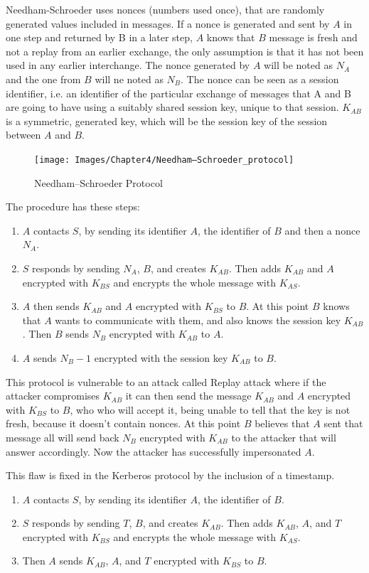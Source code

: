 Needham-Schroeder uses nonces (numbers used once), that are randomly generated values included in messages. If a nonce is generated and sent by $A$ in one step and returned by B in a later step, $A$ knows that $B$ message is fresh and not a replay from an earlier exchange, the only assumption is that it has not been used in any earlier interchange. The nonce generated by $A$ will be noted as $N_{A}$ and the one from $B$ will ne noted as $N_{B}$. The nonce can be seen as a session identifier, i.e. an identifier of the particular exchange of messages that A and B are going to have using a suitably shared session key, unique to that session. $K_{AB}$ is a symmetric, generated key, which will be the session key of the session between $A$ and $B$.

\begin{figure}
	\centering
	\texttt{[image: Images/Chapter4/Needham–Schroeder\_protocol]}
	\caption{Needham–Schroeder Protocol}
	\label{fig:needhamschroederprotocol}
\end{figure}

The procedure has these steps:
\begin{enumerate}
	\item $A$ contacts $S$, by sending its identifier $A$, the identifier of $B$ and then a nonce $N_{A}$.
	\item $S$ responds by sending $N_{A}$, $B$, and creates $K_{AB}$. Then adds $K_{AB}$ and $A$ encrypted with $K_{BS}$ and encrypts the whole message with $K_{AS}$.
	\item $A$ then sends $K_{AB}$ and $A$ encrypted with $K_{BS}$ to $B$. At this point $B$ knows that $A$ wants to communicate with them, and also knows the session key $K_{AB}$. Then $B$ sends $N_{B}$ encrypted with $K_{AB}$ to $A$.
	\item $A$ sends $N_{B} - 1$ encrypted with the session key $K_{AB}$ to $B$.
\end{enumerate}

This protocol is vulnerable to an attack called Replay attack where if the attacker compromises $K_{AB}$ it can then send the message $K_{AB}$ and $A$ encrypted with $K_{BS}$ to $B$, who who will accept it, being unable to tell that the key is not fresh, because it doesn't contain nonces. At this point $B$ believes that $A$ sent that message all will send back $N_{B}$ encrypted with $K_{AB}$ to the attacker that will answer accordingly. Now the attacker has successfully impersonated $A$.

This flaw is fixed in the Kerberos protocol by the inclusion of a timestamp.
\begin{enumerate}
	\item $A$ contacts $S$, by sending its identifier $A$, the identifier of $B$.
	\item $S$ responds by sending $T$, $B$, and creates $K_{AB}$. Then adds $K_{AB}$, $A$, and $T$ encrypted with $K_{BS}$ and encrypts the whole message with $K_{AS}$.
	\item Then $A$ sends $K_{AB}$, $A$, and $T$ encrypted with $K_{BS}$ to $B$.
\end{enumerate}

